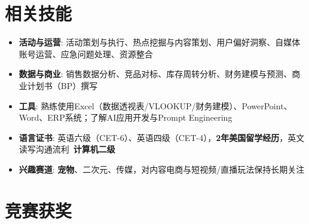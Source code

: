 \documentclass{resume}
\begin{document}
\section{相关技能}
\begin{itemize}[parsep=0.2ex]
  \item \textbf{活动与运营}: 活动策划与执行、热点挖掘与内容策划、用户偏好洞察、自媒体账号运营、应急问题处理、资源整合
  \item \textbf{数据与商业}: 销售数据分析、竞品对标、库存周转分析、财务建模与预测、商业计划书（BP）撰写
  \item \textbf{工具}: 熟练使用Excel（数据透视表/VLOOKUP/财务建模）、PowerPoint、Word、ERP系统；了解AI应用开发与Prompt Engineering
  \item \textbf{语言证书}: 英语六级（CET-6）、英语四级（CET-4），\textbf{2年美国留学经历}，英文读写沟通流利\textperiodcentered\ \textbf{计算机二级}
  \item \textbf{兴趣赛道}: \textbf{宠物}、二次元、传媒，对内容电商与短视频/直播玩法保持长期关注
\end{itemize}

\section{竞赛获奖}
\end{document}
